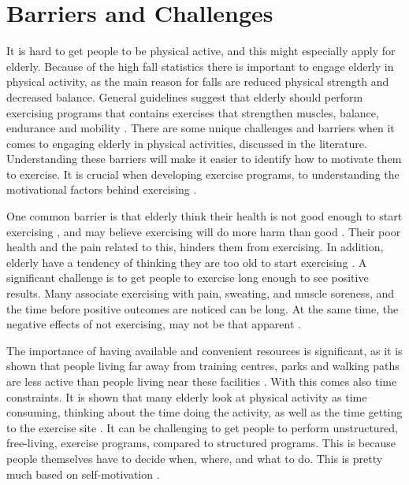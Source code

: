 \section{Barriers and Challenges}
\label{sec:barriers}
It is hard to get people to be physical active, and this might especially apply for elderly. Because of the high fall statistics there is important to engage elderly in physical activity, as the main reason for falls are reduced physical strength and decreased balance. General guidelines suggest that elderly should perform exercising programs that contains exercises that strengthen muscles, balance, endurance and mobility \cite{aktivitetsbok} \cite{gruppetrening-trheim}. There are some unique challenges and barriers when it comes to engaging elderly in physical activities, discussed in the literature. Understanding these barriers will make it easier to identify how to motivate them to exercise. It is crucial when developing exercise programs, to understanding the motivational factors behind exercising \cite{chao}.

One common barrier is that elderly think their health is not good enough to start exercising \cite{schutzer}, and may believe exercising will do more harm than good \cite{chao}. Their poor health and the pain related to this, hinders them from exercising. In addition, elderly have a tendency of thinking they are too old to start exercising \cite{schutzer}. A significant challenge is to get people to exercise long enough to see positive results. Many associate exercising with pain, sweating, and muscle soreness, and the time before positive outcomes are noticed can be long. At the same time, the negative effects of not exercising, may not be that apparent \cite{chao}. 

The importance of having available and convenient resources is significant, as it is shown that people living far away from training centres, parks and walking paths are less active than people living near these facilities \cite{schutzer}. With this comes also time constraints. It is shown that many elderly look at physical activity as time consuming, thinking about the time doing the activity, as well as the time getting to the exercise site \cite{schutzer} \cite{chao}. It can be challenging to get people to perform unstructured, free-living, exercise programs, compared to structured programs. This is because people themselves have to decide when, where, and what to do. This is pretty much based on self-motivation \cite{chao}.  

